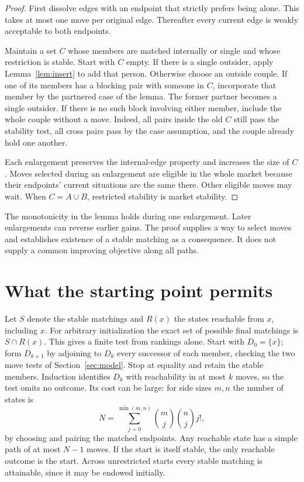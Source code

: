 \documentclass[11pt]{article}
\begin{document}
\begin{proof}
First dissolve edges with an endpoint that strictly prefers being alone. This takes at most one move per original edge. Thereafter every current edge is weakly acceptable to both endpoints.

Maintain a set \(C\) whose members are matched internally or single and whose restriction is stable. Start with \(C\) empty. If there is a single outsider, apply Lemma~\ref{lem:insert} to add that person. Otherwise choose an outside couple. If one of its members has a blocking pair with someone in \(C\), incorporate that member by the partnered case of the lemma. The former partner becomes a single outsider. If there is no such block involving either member, include the whole couple without a move. Indeed, all pairs inside the old \(C\) still pass the stability test, all cross pairs pass by the case assumption, and the couple already hold one another.

Each enlargement preserves the internal-edge property and increases the size of \(C\). Moves selected during an enlargement are eligible in the whole market because their endpoints' current situations are the same there. Other eligible moves may wait. When \(C=A\cup B\), restricted stability is market stability.
\end{proof}

The monotonicity in the lemma holds during one enlargement. Later enlargements can reverse earlier gains. The proof supplies a way to select moves and establishes existence of a stable matching as a consequence. It does not supply a common improving objective along all paths.

\section{What the starting point permits}\label{sec:start}

Let \(S\) denote the stable matchings and \(R(x)\) the states reachable from \(x\), including \(x\). For arbitrary initialization the exact set of possible final matchings is \(S\cap R(x)\). This gives a finite test from rankings alone. Start with \(D_0=\{x\}\); form \(D_{k+1}\) by adjoining to \(D_k\) every successor of each member, checking the two move tests of Section~\ref{sec:model}. Stop at equality and retain the stable members. Induction identifies \(D_k\) with reachability in at most \(k\) moves, so the test omits no outcome. Its cost can be large: for side sizes \(m,n\) the number of states is
\[
 N=\sum_{j=0}^{\min(m,n)}{m\choose j}{n\choose j}j!,
\]
by choosing and pairing the matched endpoints. Any reachable state has a simple path of at most \(N-1\) moves. If the start is itself stable, the only reachable outcome is the start. Across unrestricted starts every stable matching is attainable, since it may be endowed initially.
\end{document}
